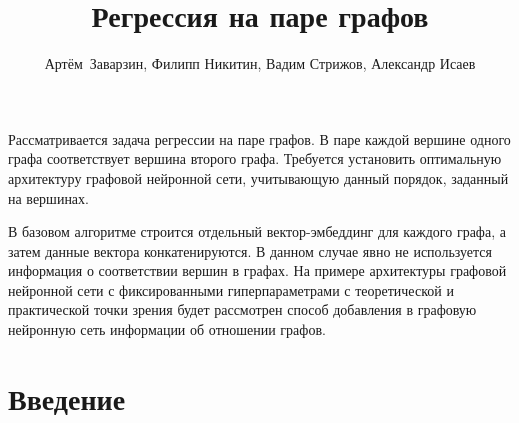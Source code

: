 \documentclass[12pt, twoside]{article}
\begin{document}
\title
    {Регрессия на паре графов}
\author
    {Артём~Заварзин, Филипп Никитин, Вадим Стрижов, Александр Исаев} %
\abstract
    {
    Рассматривается задача регрессии на паре графов. В паре каждой вершине одного графа соответствует вершина второго графа. Требуется установить оптимальную архитектуру графовой нейронной сети, учитывающую данный порядок, заданный на вершинах.
    
    В базовом алгоритме строится отдельный вектор-эмбеддинг для каждого графа, а затем данные вектора конкатенируются. В данном случае явно не используется информация о соответствии вершин в графах. На примере архитектуры графовой нейронной сети с фиксированными гиперпараметрами с теоретической и практической точки зрения будет рассмотрен способ добавления в графовую нейронную сеть информации об отношении графов.
	
\bigskip
}

\maketitle
\linenumbers

\section{Введение}
\end{document}
